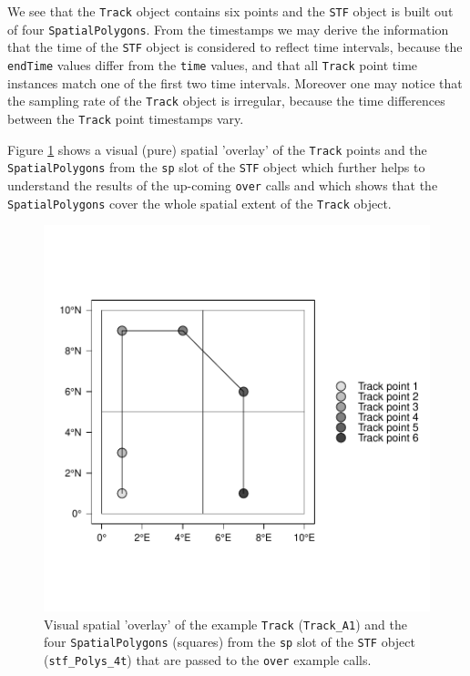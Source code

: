 \documentclass[12pt, oneside, a4paper]{scrbook}
\let\code=\texttt
\begin{document}
We see that the \code{Track} object contains six points and the \code{STF} object is built out of four \code{SpatialPolygons}. 
From the timestamps we may derive the information that the time of the \code{STF} object is considered to reflect time intervals, because the \code{endTime} values differ from the \code{time} values, and that all \code{Track} point time instances match one of the first two time intervals. Moreover one may notice that the sampling rate of the \code{Track} object is irregular, because the time differences between the \code {Track} point timestamps vary.
\par\medskip
Figure \ref{fig:tracka1pointsandpolygons} shows a visual (pure) spatial 'overlay' of the \code{Track} points and the \code{SpatialPolygons} from the \code{sp} slot of the \code{STF} object which further helps to understand the results of the up-coming \code{over} calls and which shows that the \code{SpatialPolygons} cover the whole spatial extent of the \code{Track} object.

\begin{figure}[!htb]
\centering
\includegraphics{trajagg-over_stf_inspect_byFig}
\caption[Spatial 'overlay' of example \code{Track} and polygons passed to \code{over.}]{Visual spatial 'overlay' of the example \code{Track} (\code{Track\_A1}) and the four \code{SpatialPolygons} (squares) from the \code{sp} slot of the \code{STF} object (\code{stf\_Polys\_4t}) that are passed to the \code{over} example calls.}
\label{fig:tracka1pointsandpolygons}
\end{figure}
\end{document}
